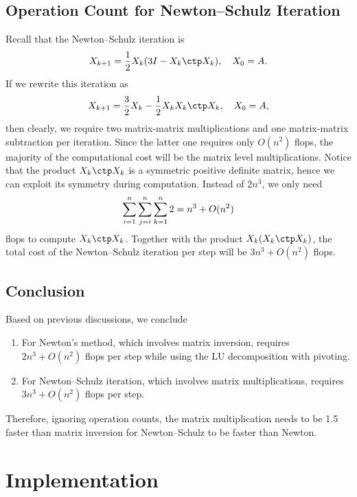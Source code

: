 \documentclass{article}
\numberwithin{equation}{section} %
\begin{document}
\subsection{Operation Count for Newton--Schulz Iteration}
Recall that the Newton--Schulz iteration is
\begin{equation}\notag
  X_{k+1} = \frac 12 X_k(3I-X_k\ctp X_k),\quad X_0 = A.
\end{equation}
If we rewrite this iteration as
\begin{equation}
  \notag
  X_{k+1} = \frac{3}{2} X_k - \frac{1}{2}X_kX_k\ctp X_k,\quad X_0 = A,
\end{equation}
then clearly, we require two matrix-matrix multiplications and one
matrix-matrix subtraction per iteration. Since the latter one requires only
$O(n^2)$ flops, the majority of the computational cost will be the matrix
level multiplications. Notice that the product $X_k\ctp X_k$ is a symmetric
positive definite matrix, hence we can exploit its symmetry during
computation. Instead of $2n^3$, we only need
\begin{equation}
  \notag 
  \sum_{i=1}^n\sum_{j=i}^n\sum_{k=1}^n 2 = n^3 + O(n^2)
\end{equation}
flops to compute $X_k\ctp X_k$. Together with the product
$X_k(X_k\ctp X_k)$, the total cost of the Newton--Schulz iteration per step
will be $3n^3 + O(n^2)$ flops.

\subsection{Conclusion}
Based on previous discussions, we conclude
\begin{enumerate}
\item For Newton's method, which involves matrix inversion, requires
$2n^3 + O(n^2)$ flops per step while using the LU decomposition with
pivoting.
\item For Newton--Schulz iteration, which involves matrix multiplications,
requires $3n^3 + O(n^2)$ flops per step.
\end{enumerate}

Therefore, ignoring operation counts, the matrix multiplication needs to be
1.5 faster than matrix inversion for Newton--Schulz to be faster than
Newton.

\section{Implementation}
\end{document}

